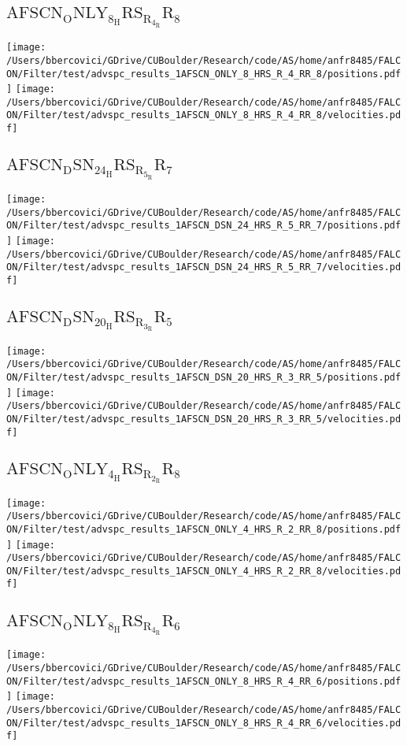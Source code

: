 \subsection{$\mathrm{AFSCN_ONLY_8_HRS_R_4_RR_8}$}
\texttt{[image: /Users/bbercovici/GDrive/CUBoulder/Research/code/AS/home/anfr8485/FALCON/Filter/test/advspc\_results\_1AFSCN\_ONLY\_8\_HRS\_R\_4\_RR\_8/positions.pdf]}
\texttt{[image: /Users/bbercovici/GDrive/CUBoulder/Research/code/AS/home/anfr8485/FALCON/Filter/test/advspc\_results\_1AFSCN\_ONLY\_8\_HRS\_R\_4\_RR\_8/velocities.pdf]}
\subsection{$\mathrm{AFSCN_DSN_24_HRS_R_5_RR_7}$}
\texttt{[image: /Users/bbercovici/GDrive/CUBoulder/Research/code/AS/home/anfr8485/FALCON/Filter/test/advspc\_results\_1AFSCN\_DSN\_24\_HRS\_R\_5\_RR\_7/positions.pdf]}
\texttt{[image: /Users/bbercovici/GDrive/CUBoulder/Research/code/AS/home/anfr8485/FALCON/Filter/test/advspc\_results\_1AFSCN\_DSN\_24\_HRS\_R\_5\_RR\_7/velocities.pdf]}
\subsection{$\mathrm{AFSCN_DSN_20_HRS_R_3_RR_5}$}
\texttt{[image: /Users/bbercovici/GDrive/CUBoulder/Research/code/AS/home/anfr8485/FALCON/Filter/test/advspc\_results\_1AFSCN\_DSN\_20\_HRS\_R\_3\_RR\_5/positions.pdf]}
\texttt{[image: /Users/bbercovici/GDrive/CUBoulder/Research/code/AS/home/anfr8485/FALCON/Filter/test/advspc\_results\_1AFSCN\_DSN\_20\_HRS\_R\_3\_RR\_5/velocities.pdf]}
\subsection{$\mathrm{AFSCN_ONLY_4_HRS_R_2_RR_8}$}
\texttt{[image: /Users/bbercovici/GDrive/CUBoulder/Research/code/AS/home/anfr8485/FALCON/Filter/test/advspc\_results\_1AFSCN\_ONLY\_4\_HRS\_R\_2\_RR\_8/positions.pdf]}
\texttt{[image: /Users/bbercovici/GDrive/CUBoulder/Research/code/AS/home/anfr8485/FALCON/Filter/test/advspc\_results\_1AFSCN\_ONLY\_4\_HRS\_R\_2\_RR\_8/velocities.pdf]}
\subsection{$\mathrm{AFSCN_ONLY_8_HRS_R_4_RR_6}$}
\texttt{[image: /Users/bbercovici/GDrive/CUBoulder/Research/code/AS/home/anfr8485/FALCON/Filter/test/advspc\_results\_1AFSCN\_ONLY\_8\_HRS\_R\_4\_RR\_6/positions.pdf]}
\texttt{[image: /Users/bbercovici/GDrive/CUBoulder/Research/code/AS/home/anfr8485/FALCON/Filter/test/advspc\_results\_1AFSCN\_ONLY\_8\_HRS\_R\_4\_RR\_6/velocities.pdf]}
